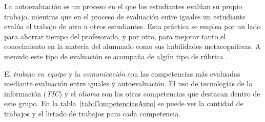 La autoevaluación es un proceso en el que los estudiantes evalúan su propio trabajo, mientras que  en el proceso de evaluación entre iguales un estudiante evalúa el trabajo de otro u otros estudiantes. Esta práctica se emplea por un lado para ahorrar tiempo del profesorado, y por otro, para mejorar tanto el conocimiento en la materia del alumnado como sus habilidades metacognitivas. A menudo este tipo de evaluación se acompaña de algún tipo de rúbrica \cite{malehorn1994ten}.

El \emph{trabajo en equipo} y la \emph{comunicación} son las competencias más evaluadas mediante evaluación entre iguales y autoevaluación. El uso de tecnologías de la información (\emph{TIC}) y el \emph{idioma} son las otras competencias que destacan dentro de este grupo. En la tabla~\ref{tab:CompetenciasAuto} se puede ver la cantidad de trabajos y el listado de trabajos para cada competencia.

